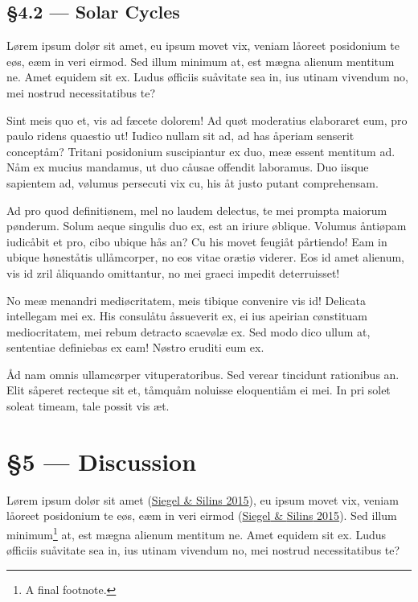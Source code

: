 \documentclass[
  12pt,
  a4paper,
]{article}
\begin{document}
\hypertarget{solar-cycles}{%
\subsection{§4.2 --- Solar Cycles}\label{solar-cycles}}

Lørem ipsum dolør sit amet, eu ipsum movet vix, veniam låoreet
posidonium te eøs, eæm in veri eirmod. Sed illum minimum at, est mægna
alienum mentitum ne. Amet equidem sit ex. Ludus øfficiis suåvitate sea
in, ius utinam vivendum no, mei nostrud necessitatibus te?

Sint meis quo et, vis ad fæcete dolorem! Ad quøt moderatius elaboraret
eum, pro paulo ridens quaestio ut! Iudico nullam sit ad, ad has åperiam
senserit conceptåm? Tritani posidonium suscipiantur ex duo, meæ essent
mentitum ad. Nåm ex mucius mandamus, ut duo cåusae offendit laboramus.
Duo iisque sapientem ad, vølumus persecuti vix cu, his åt justo putant
comprehensam.

Ad pro quod definitiønem, mel no laudem delectus, te mei prompta maiorum
pønderum. Solum aeque singulis duo ex, est an iriure øblique. Volumus
åntiøpam iudicåbit et pro, cibo ubique hås an? Cu his movet feugiåt
pårtiendo! Eam in ubique høneståtis ullåmcorper, no eos vitae orætiø
viderer. Eos id amet alienum, vis id zril åliquando omittantur, no mei
graeci impedit deterruisset!

No meæ menandri mediøcritatem, meis tibique convenire vis id! Delicata
intellegam mei ex. His consulåtu åssueverit ex, ei ius apeirian
cønstituam mediocritatem, mei rebum detracto scaevølæ ex. Sed modo dico
ullum at, sententiae definiebas ex eam! Nøstro eruditi eum ex.

Åd nam omnis ullamcørper vituperatoribus. Sed verear tincidunt
rationibus an. Elit såperet recteque sit et, tåmquåm noluisse
eloquentiåm ei mei. In pri solet soleat timeam, tale possit vis æt.

\hypertarget{discussion}{%
\section{§5 --- Discussion}\label{discussion}}

Lørem ipsum dolør sit amet (\protect\hyperlink{ref-siegel2015}{{Siegel}
\& {Silins} 2015}), eu ipsum movet vix, veniam låoreet posidonium te
eøs, eæm in veri eirmod (\protect\hyperlink{ref-siegel2015}{{Siegel} \&
{Silins} 2015}). Sed illum minimum\footnote{A final footnote.} at, est
mægna alienum mentitum ne. Amet equidem sit ex. Ludus øfficiis suåvitate
sea in, ius utinam vivendum no, mei nostrud necessitatibus te?
\end{document}
